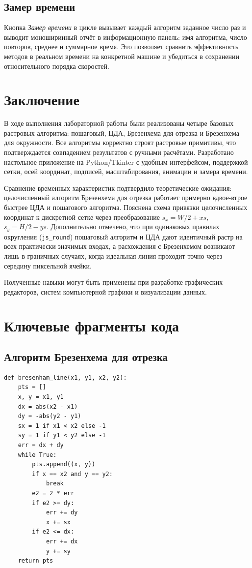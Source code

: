 \documentclass[a4paper,14pt]{extarticle}
\begin{document}
\subsection{Замер времени}
Кнопка \textit{Замер времени} в цикле вызывает каждый алгоритм заданное число раз и выводит моноширинный отчёт в информационную панель: имя алгоритма, число повторов, среднее и суммарное время. Это позволяет сравнить эффективность методов в реальном времени на конкретной машине и убедиться в сохранении относительного порядка скоростей.

\section{Заключение}

В ходе выполнения лабораторной работы были реализованы четыре базовых растровых алгоритма: пошаговый, ЦДА, Брезенхема для отрезка и Брезенхема для окружности. Все алгоритмы корректно строят растровые примитивы, что подтверждается совпадением результатов с ручными расчётами. Разработано настольное приложение на Python/Tkinter с удобным интерфейсом, поддержкой сетки, осей координат, подписей, масштабирования, анимации и замера времени.

Сравнение временных характеристик подтвердило теоретические ожидания: целочисленный алгоритм Брезенхема для отрезка работает примерно вдвое-втрое быстрее ЦДА и пошагового алгоритма. Пояснена схема привязки целочисленных координат к дискретной сетке через преобразование $s_x = W/2 + xs$, $s_y = H/2 - ys$. Дополнительно отмечено, что при одинаковых правилах округления (\texttt{js\_round}) пошаговый алгоритм и ЦДА дают идентичный растр на всех практически значимых входах, а расхождения с Брезенхемом возникают лишь в граничных случаях, когда идеальная линия проходит точно через середину пиксельной ячейки.

Полученные навыки могут быть применены при разработке графических редакторов, систем компьютерной графики и визуализации данных.

\appendix
\section{Ключевые фрагменты кода}

\subsection{Алгоритм Брезенхема для отрезка}
\begin{lstlisting}[caption={bresenham\_line(x1, y1, x2, y2)}]
def bresenham_line(x1, y1, x2, y2):
    pts = []
    x, y = x1, y1
    dx = abs(x2 - x1)
    dy = -abs(y2 - y1)
    sx = 1 if x1 < x2 else -1
    sy = 1 if y1 < y2 else -1
    err = dx + dy
    while True:
        pts.append((x, y))
        if x == x2 and y == y2:
            break
        e2 = 2 * err
        if e2 >= dy:
            err += dy
            x += sx
        if e2 <= dx:
            err += dx
            y += sy
    return pts
\end{lstlisting}
\end{document}

